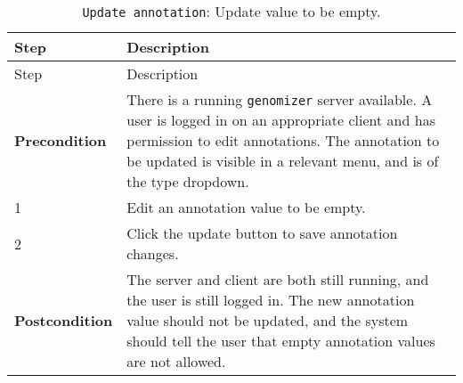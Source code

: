 \begin{longtable}[c]{@{}ll@{}}
\caption{\texttt{Update\ annotation}: Update value to be
empty.}\tabularnewline
\toprule
\begin{minipage}[b]{0.31\columnwidth}\raggedright\strut
Step
\strut\end{minipage} &
\begin{minipage}[b]{0.63\columnwidth}\raggedright\strut
Description
\strut\end{minipage}\tabularnewline
\midrule
\endfirsthead
\toprule
\begin{minipage}[b]{0.31\columnwidth}\raggedright\strut
Step
\strut\end{minipage} &
\begin{minipage}[b]{0.63\columnwidth}\raggedright\strut
Description
\strut\end{minipage}\tabularnewline
\midrule
\endhead
\begin{minipage}[t]{0.31\columnwidth}\raggedright\strut
\textbf{Precondition}
\strut\end{minipage} &
\begin{minipage}[t]{0.63\columnwidth}\raggedright\strut
There is a running \texttt{genomizer} server available. A user is logged
in on an appropriate client and has permission to edit annotations. The
annotation to be updated is visible in a relevant menu, and is of the
type dropdown.
\strut\end{minipage}\tabularnewline
\begin{minipage}[t]{0.31\columnwidth}\raggedright\strut
1
\strut\end{minipage} &
\begin{minipage}[t]{0.63\columnwidth}\raggedright\strut
Edit an annotation value to be empty.
\strut\end{minipage}\tabularnewline
\begin{minipage}[t]{0.31\columnwidth}\raggedright\strut
2
\strut\end{minipage} &
\begin{minipage}[t]{0.63\columnwidth}\raggedright\strut
Click the update button to save annotation changes.
\strut\end{minipage}\tabularnewline
\begin{minipage}[t]{0.31\columnwidth}\raggedright\strut
\textbf{Postcondition}
\strut\end{minipage} &
\begin{minipage}[t]{0.63\columnwidth}\raggedright\strut
The server and client are both still running, and the user is still
logged in. The new annotation value should not be updated, and the
system should tell the user that empty annotation values are not
allowed.
\strut\end{minipage}\tabularnewline
\bottomrule
\end{longtable}

